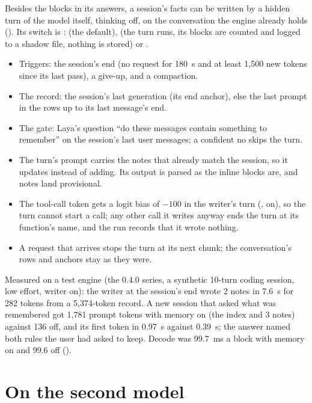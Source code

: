 Besides the blocks in its answers, a session's facts can be written by a hidden turn of the model itself, thinking off, on the conversation the engine already holds (). Its switch is :  (the default),  (the turn runs, its blocks are counted and logged to a shadow file, nothing is stored) or .

\begin{itemize}
\item Triggers: the session's end (no request for 180~s and at least 1,500 new tokens since its last pass), a give-up, and a compaction.
\item The record: the session's last generation (its end anchor), else the last prompt in the rows up to its last message's end.
\item The gate: Laya's question \enquote{do these messages contain something to remember} on the session's last user messages; a confident no skips the turn.
\item The turn's prompt carries the notes that already match the session, so it updates instead of adding. Its output is parsed as the inline blocks are, and notes land provisional.
\item The tool-call token gets a logit bias of $-100$ in the writer's turn (, on), so the turn cannot start a call; any other call it writes anyway ends the turn at its function's name, and the run records that it wrote nothing.
\item A request that arrives stops the turn at its next chunk; the conversation's rows and anchors stay as they were.
\end{itemize}

Measured on a test engine (the 0.4.0 series, a synthetic 10-turn coding session, low effort, writer on): the writer at the session's end wrote 2 notes in 7.6~s for 282 tokens from a 5,374-token record. A new session that asked what was remembered got 1,781 prompt tokens with memory on (the index and 3 notes) against 136 off, and its first token in 0.97~s against 0.39~s; the answer named both rules the user had asked to keep. Decode was 99.7~ms a block with memory on and 99.6 off (\measured).

\section{On the second model}

